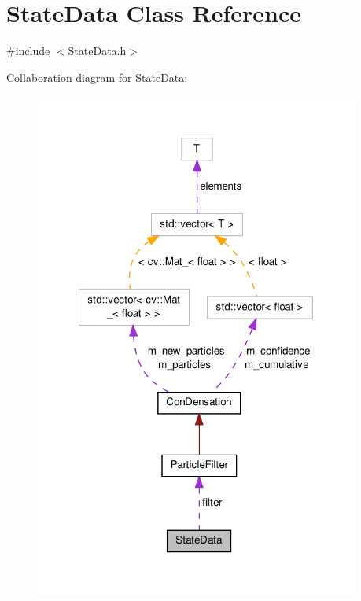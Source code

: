 \hypertarget{classStateData}{\section{State\-Data Class Reference}
\label{classStateData}
}


{\ttfamily \#include $<$State\-Data.\-h$>$}



Collaboration diagram for State\-Data\-:\nopagebreak
\begin{figure}[H]
\begin{center}
\leavevmode
\includegraphics[width=302pt]{classStateData__coll__graph}
\end{center}
\end{figure}

